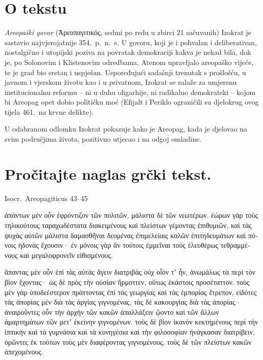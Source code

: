 


\section*{O tekstu}

\textit{Areopaški govor} (Ἀρεοπαγιτικός, sedmi po redu u zbirci 21 sačuvanih) Izokrat je sastavio najvjerojatnije 354.\ p.~n.~e. U govoru, koji je i pohvalan i deliberativan, nostalgično i utopijski poziva na povratak demokraciji kakva je nekad bila, dok je, po Solonovim i Klistenovim odredbama, Atenom upravljalo areopaško vijeće, te je grad bio sretan i uspješan. Uspoređujući sadašnji trenutak s prošlošću, u javnom i vjerskom životu kao i u privatnom, Izokrat se zalaže za umjerenu institucionalnu reformu – ni u duhu oligarhije, ni radikalno demokratski – kojom bi Areopag opet dobio političku moć (Efijalt i Periklo ograničili su djelokrug ovog tijela 461.\ na krvne delikte).

U odabranom odlomku Izokrat pokazuje kako je Areopag, kada je djelovao na svim područjima života, pozitivno utjecao i na odgoj omladine.


\section*{Pročitajte naglas grčki tekst.}

Isocr.\ Areopagiticus 43–45


\medskip


{\large

\begin{greek}

\noindent  ἁπάντων μὲν οὖν ἐφρόντιζον τῶν πολιτῶν, μάλιστα δὲ τῶν νεωτέρων. ἑώρων γὰρ τοὺς τηλικούτους ταραχωδέστατα διακειμένους καὶ πλείστων γέμοντας ἐπιθυμιῶν, καὶ τὰς ψυχὰς αὐτῶν μάλιστα δαμασθῆναι δεομένας ἐπιμελείαις καλῶν ἐπιτηδευμάτων καὶ πόνοις ἡδονὰς ἔχουσιν· ἐν μόνοις γὰρ ἂν τούτοις ἐμμεῖναι τοὺς ἐλευθέρως τεθραμμένους καὶ μεγαλοφρονεῖν εἰθισμένους.

\noindent  ἅπαντας μὲν οὖν ἐπὶ τὰς αὐτὰς ἄγειν διατριβὰς οὐχ οἷόν τʼ ἦν, ἀνωμάλως τὰ περὶ τὸν βίον ἔχοντας· ὡς δὲ πρὸς τὴν οὐσίαν ἥρμοττεν, οὕτως ἑκάστοις προσέταττον. τοὺς μὲν γὰρ ὑποδεέστερον πράττοντας ἐπὶ τὰς γεωργίας καὶ τὰς ἐμπορίας ἔτρεπον, εἰδότες τὰς ἀπορίας μὲν διὰ τὰς ἀργίας γιγνομένας, τὰς δὲ κακουργίας διὰ τὰς ἀπορίας· ἀναιροῦντες οὖν τὴν ἀρχὴν τῶν κακῶν ἀπαλλάξειν ᾤοντο καὶ τῶν ἄλλων ἁμαρτημάτων τῶν μετʼ ἐκείνην γιγνομένων. τοὺς δὲ βίον ἱκανὸν κεκτημένους περὶ τὴν ἱππικὴν καὶ τὰ γυμνάσια καὶ τὰ κυνηγέσια καὶ τὴν φιλοσοφίαν ἠνάγκασαν διατρίβειν, ὁρῶντες ἐκ τούτων τοὺς μὲν διαφέροντας γιγνομένους, τοὺς δὲ τῶν πλείστων κακῶν ἀπεχομένους.
\end{greek}

}

